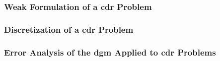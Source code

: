 \begin{frame}
    \frametitle{Weak Formulation of a \acrfull{cdr} Problem}

    
\end{frame}

\begin{frame}
    \frametitle{Discretization of a \acrshort{cdr} Problem}

    
\end{frame}

\begin{frame}
    \frametitle{Error Analysis of the \acrshort{dgm} Applied to \acrshort{cdr} Problems}

    
\end{frame}
